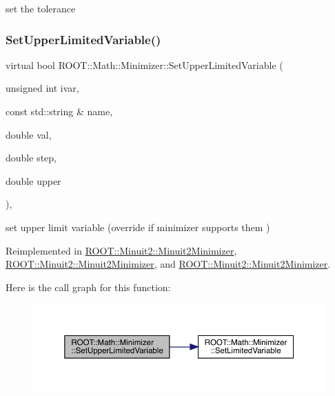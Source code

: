set the tolerance 

\mbox{\label{classROOT_1_1Math_1_1Minimizer_a804843fbaea82809b3c54232d0c1fe86}} 
\subsubsection{\texorpdfstring{SetUpperLimitedVariable()}{SetUpperLimitedVariable()}\hspace{0.1cm}{\footnotesize\ttfamily [1/3]}}
{\footnotesize\ttfamily virtual bool R\+O\+O\+T\+::\+Math\+::\+Minimizer\+::\+Set\+Upper\+Limited\+Variable (\begin{DoxyParamCaption}\item[{unsigned int}]{ivar,  }\item[{const std\+::string \&}]{name,  }\item[{double}]{val,  }\item[{double}]{step,  }\item[{double}]{upper }\end{DoxyParamCaption})\hspace{0.3cm}{\ttfamily [inline]}, {\ttfamily [virtual]}}



set upper limit variable (override if minimizer supports them ) 



Reimplemented in \mbox{\hyperlink{classROOT_1_1Minuit2_1_1Minuit2Minimizer_a70209b37c419af5d8d1475ce8de29b43}{R\+O\+O\+T\+::\+Minuit2\+::\+Minuit2\+Minimizer}}, \mbox{\hyperlink{classROOT_1_1Minuit2_1_1Minuit2Minimizer_a70209b37c419af5d8d1475ce8de29b43}{R\+O\+O\+T\+::\+Minuit2\+::\+Minuit2\+Minimizer}}, and \mbox{\hyperlink{classROOT_1_1Minuit2_1_1Minuit2Minimizer_a70209b37c419af5d8d1475ce8de29b43}{R\+O\+O\+T\+::\+Minuit2\+::\+Minuit2\+Minimizer}}.

Here is the call graph for this function\+:
\nopagebreak
\begin{figure}[H]
\begin{center}
\leavevmode
\includegraphics[width=350pt]{dc/dc4/classROOT_1_1Math_1_1Minimizer_a804843fbaea82809b3c54232d0c1fe86_cgraph}
\end{center}
\end{figure}
\mbox{\label{classROOT_1_1Math_1_1Minimizer_a804843fbaea82809b3c54232d0c1fe86}} 
